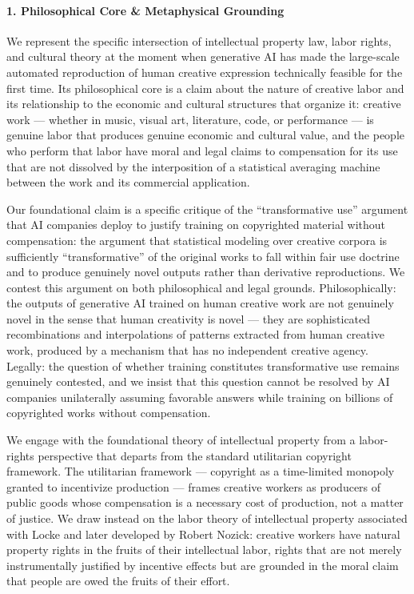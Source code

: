 \paragraph{1. Philosophical Core \& Metaphysical
Grounding}\label{philosophical-core-metaphysical-grounding-38}

We represent the specific intersection of intellectual property law,
labor rights, and cultural theory at the moment when generative AI has
made the large-scale automated reproduction of human creative expression
technically feasible for the first time. Its philosophical core is a
claim about the nature of creative labor and its relationship to the
economic and cultural structures that organize it: creative work ---
whether in music, visual art, literature, code, or performance --- is
genuine labor that produces genuine economic and cultural value, and the
people who perform that labor have moral and legal claims to
compensation for its use that are not dissolved by the interposition of
a statistical averaging machine between the work and its commercial
application.

Our foundational claim is a specific critique of the ``transformative
use'' argument that AI companies deploy to justify training on
copyrighted material without compensation: the argument that statistical
modeling over creative corpora is sufficiently ``transformative'' of the
original works to fall within fair use doctrine and to produce genuinely
novel outputs rather than derivative reproductions. We contest this
argument on both philosophical and legal grounds. Philosophically: the
outputs of generative AI trained on human creative work are not
genuinely novel in the sense that human creativity is novel --- they are
sophisticated recombinations and interpolations of patterns extracted
from human creative work, produced by a mechanism that has no
independent creative agency. Legally: the question of whether training
constitutes transformative use remains genuinely contested, and we
insist that this question cannot be resolved by AI companies
unilaterally assuming favorable answers while training on billions of
copyrighted works without compensation.

We engage with the foundational theory of intellectual property from a
labor-rights perspective that departs from the standard utilitarian
copyright framework. The utilitarian framework --- copyright as a
time-limited monopoly granted to incentivize production --- frames
creative workers as producers of public goods whose compensation is a
necessary cost of production, not a matter of justice. We draw instead
on the labor theory of intellectual property associated with Locke and
later developed by Robert Nozick: creative workers have natural property
rights in the fruits of their intellectual labor, rights that are not
merely instrumentally justified by incentive effects but are grounded in
the moral claim that people are owed the fruits of their effort.

